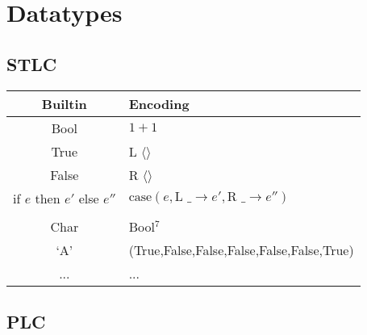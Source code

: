 \documentclass[a4paper,11pt]{article}
\begin{document}
\section{Datatypes}
{
    \subsection{STLC}
    {
        \begin{tabular}{c | l}
        Builtin & Encoding \\
        \hline
        Bool & \(1+1\) \\
        True & L \(\langle\rangle\) \\
        False & R \(\langle\rangle\) \\
        if \(e\) then \(e'\) else \(e''\) & \(\text{case}(e,\text{L \_}\rightarrow e',\text{R \_}\rightarrow e'')\) \\
        \\
        Char & Bool\(^7\) \\
        `A' & (True,False,False,False,False,False,True) \\
        ... & ...
        \end{tabular}
    }
    \subsection{PLC}
    {

}}
\end{document}
